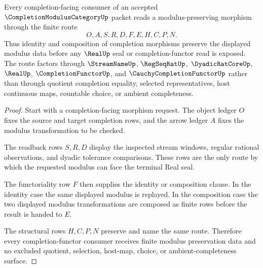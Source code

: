 \begin{theorem}
\label{thm:completion-modulus-category-modulus-functoriality}
Every completion-facing consumer of an accepted $\CompletionModulusCategoryUp$ packet reads a modulus-preserving morphism through the finite route
$$
O,A,S,R,D,F,E,H,C,P,N .
$$
Thus identity and composition of completion morphisms preserve the displayed modulus data before any $\RealUp$ seal or completion-functor read is exposed. The route factors through $\StreamNameUp$, $\RegSeqRatUp$, $\DyadicRatCoreUp$, $\RealUp$, $\CompletionFunctorUp$, and $\CauchyCompletionFunctorUp$ rather than through quotient completion equality, selected representatives, host continuous maps, countable choice, or ambient completeness.
\end{theorem}
\begin{proof}
Start with a completion-facing morphism request. The object ledger $O$ fixes the source and target completion rows, and the arrow ledger $A$ fixes the modulus transformation to be checked.

The readback rows $S,R,D$ display the inspected stream windows, regular rational observations, and dyadic tolerance comparisons. These rows are the only route by which the requested modulus can face the terminal Real seal.

The functoriality row $F$ then supplies the identity or composition clause. In the identity case the same displayed modulus is replayed. In the composition case the two displayed modulus transformations are composed as finite rows before the result is handed to $E$.

The structural rows $H,C,P,N$ preserve and name the same route. Therefore every completion-functor consumer receives finite modulus preservation data and no excluded quotient, selection, host-map, choice, or ambient-completeness surface.
\end{proof}


